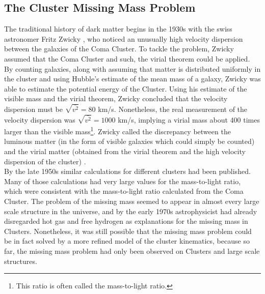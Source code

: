 \subsection{The Cluster Missing Mass Problem}
The traditional history of dark matter begins in the 1930s with the swiss astronomer Fritz Zwicky\cite{aHistory} \cite{tasiCline}, who noticed an unusually high velocity dispersion between the galaxies of the Coma Cluster.
To tackle the problem, Zwicky assumed that the Coma Cluster  \cite{englishZwicky} and such, the virial theorem could be applied.
By counting galaxies, along with assuming that matter is distributed uniformly in the cluster and using Hubble's estimate of the mean mass of a galaxy, Zwicky was able to estimate the potential energy of the Cluster.
Using his estimate of the visible mass and the virial theorem, Zwicky concluded that the velocity dispersion must be $\sqrt{\bar{v^2}} = 80$ km/s.
Nonetheless, the real measurement of the velocity dispersion was $\sqrt{\bar{v^2}} = 1000$ km/s, implying a virial mass about 400 times larger than the visible mass\footnote{This ratio is often called the mass-to-light ratio.}.
Zwicky called the discrepancy between the luminous matter (in the form of visible galaxies which could simply be counted) and the virial matter (obtained from the virial theorem and the high velocity dispersion of the cluster) . \\

By the late 1950s similar calculations for different clusters had been published. Many of those calculations had very large values for the mass-to-light ratio\cite{schwarzschildSon}, which were consistent with the mass-to-light ratio calculated from the Coma Cluster. The problem of the missing mass seemed to appear in almost every large scale structure in the universe, and by the early 1970s astrophysicist had already disregarded hot gas\cite{meekins} and free hydrogen\cite{penzias} as explanations for the missing mass in Clusters. Nonetheless, it was still possible that the missing mass problem could be in fact solved by a more refined model of the cluster kinematics, because so far, the missing mass problem had only been observed on Clusters and large scale structures.\\


